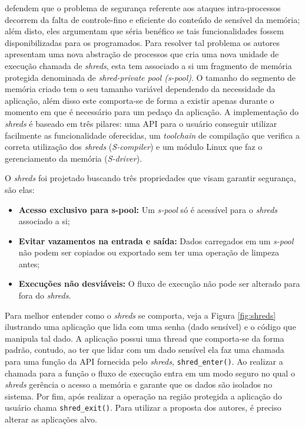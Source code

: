 \cite{shreds} defendem que o problema de segurança referente aos ataques
intra-processos decorrem da falta de controle-fino e eficiente do conteúdo de
sensível da memória; além disto, eles argumentam que séria benéfico se tais
funcionalidades fossem disponibilizadas para os programados.  Para resolver tal
problema os autores apresentam uma nova abstração de processos que cria uma
nova unidade de execução chamada de \emph{shreds}, esta tem associado a si um
fragmento de memória protegida denominada de \emph{shred-private pool
(s-pool)}. O tamanho do segmento de memória criado tem o seu tamanho variável
dependendo da necessidade da aplicação, além disso este comporta-se de forma a
existir apenas durante o momento em que é necessário para um pedaço da
aplicação. A implementação do \emph{shreds} é baseado em três pilares: uma API
para o usuário conseguir utilizar facilmente as funcionalidade oferecidas, um
\emph{toolchain} de compilação que verifica a correta utilização dos
\emph{shreds} (\emph{S-compiler}) e um módulo Linux que faz o gerenciamento da
memória (\emph{S-driver}).

O \emph{shreds} foi projetado buscando três propriedades que visam garantir
segurança, são elas:

\begin{itemize}
  \item \textbf{Acesso exclusivo para s-pool:} Um \emph{s-pool} só é acessível
        para o \emph{shreds} associado a si;
  \item \textbf{Evitar vazamentos na entrada e saída:} Dados carregados em um
        \emph{s-pool} não podem ser copiados ou exportado sem ter uma operação
        de limpeza antes;
  \item \textbf{Execuções não desviáveis:} O fluxo de execução não pode ser
        alterado para fora do \emph{shreds}.
\end{itemize}

Para melhor entender como o \emph{shreds} se comporta, veja a Figura
\ref{fig:shreds} ilustrando uma aplicação que lida com uma senha (dado
sensível) e o código que manipula tal dado. A aplicação possui uma thread que
comporta-se da forma padrão, contudo, ao ter que lidar com um dado sensível ela
faz uma chamada para uma função da API fornecida pelo \emph{shreds},
\texttt{shred\_enter()}. Ao realizar a chamada para a função o fluxo de
execução entra em um modo seguro no qual o \emph{shreds} gerência o acesso a
memória e garante que os dados são isolados no sistema. Por fim, após realizar
a operação na região protegida a aplicação do usuário chama
\texttt{shred\_exit()}. Para utilizar a proposta dos autores, é preciso alterar
as aplicações alvo.

